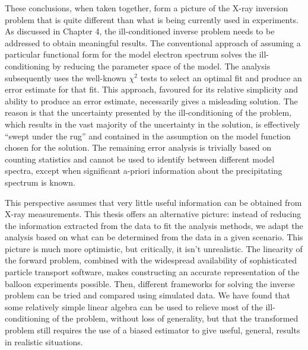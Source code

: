 These conclusions, when taken together, form a picture of the X-ray inversion problem that is quite different than what is being currently used in experiments. As discussed in Chapter 4, the ill-conditioned inverse problem needs to be addressed to obtain meaningful results. The conventional approach of assuming a particular functional form for the model electron spectrum solves the ill-conditioning by reducing the parameter space of the model. The analysis subsequently uses the well-known $\chi^2$ tests to select an optimal fit and produce an error estimate for that fit. This approach, favoured for its relative simplicity and ability to produce an error estimate, necessarily gives a misleading solution. The reason is that the uncertainty presented by the ill-conditioning of the problem, which results in the vast majority of the uncertainty in the solution, is effectively ``swept under the rug'' and contained in the assumption on the model function chosen for the solution. The remaining error analysis is trivially based on counting statistics and cannot be used to identify between different model spectra, except when significant a-priori information about the precipitating spectrum is known. 

This perspective assumes that very little useful information can be obtained from X-ray measurements. This thesis offers an alternative picture: instead of reducing the information extracted from the data to fit the analysis methods, we adapt the analysis based on what can be determined from the data in a given scenario. This picture is much more optimistic, but critically, it isn't unrealistic. The linearity of the forward problem, combined with the widespread availability of sophisticated particle transport software, makes constructing an accurate representation of the balloon experiments possible. Then, different frameworks for solving the inverse problem can be tried and compared using simulated data. We have found that some relatively simple linear algebra can be used to relieve most of the ill-conditioning of the problem, without loss of generality, but that the transformed problem still requires the use of a biased estimator to give useful, general, results in realistic situations. 

